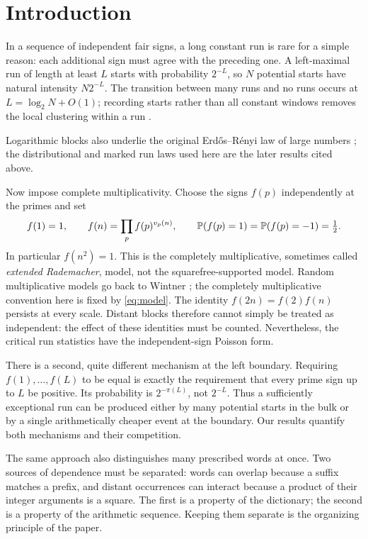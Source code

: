 \section{Introduction}\label{sec:introduction}
In a sequence of independent fair signs, a long constant run is rare for a
simple reason: each additional sign must agree with the preceding one.
A left-maximal run of length at least $L$ starts with probability $2^{-L}$,
so $N$ potential starts have natural intensity $N2^{-L}$. The transition
between many runs and no runs occurs at $L=\log_2N+O(1)$; recording starts
rather than all constant windows removes the local clustering within a run
\cite{ArratiaGoldsteinGordon1990,ArratiaGordonWaterman1990,Godbole1991}.

Logarithmic blocks also underlie the original Erd\H{o}s--R\'enyi law
of large numbers \cite{ErdosRenyi1970}; the distributional and marked
run laws used here are the later results cited above.

Now impose complete multiplicativity. Choose the signs $f(p)$ independently
at the primes and set
\begin{equation}\label{eq:model}
 f(1)=1,\qquad f(n)=\prod_p f(p)^{v_p(n)},\qquad
 \mathbb P(f(p)=1)=\mathbb P(f(p)=-1)=\tfrac12.
\end{equation}
In particular $f(n^2)=1$. This is the completely multiplicative, sometimes
called \emph{extended Rademacher}, model, not the squarefree-supported model. Random
multiplicative models go back to Wintner \cite{Wintner1944}; the
completely multiplicative convention here is fixed by \eqref{eq:model}.
The identity $f(2n)=f(2)f(n)$ persists at every scale. Distant blocks therefore cannot simply be treated as independent: the
effect of these identities must be counted. Nevertheless, the critical run
statistics have the independent-sign Poisson form.

There is a second, quite different mechanism at the left boundary. Requiring
$f(1),\ldots,f(L)$ to be equal is exactly the requirement that every prime
sign up to $L$ be positive. Its probability is $2^{-\pi(L)}$, not $2^{-L}$.
Thus a sufficiently exceptional run can be produced either by many potential
starts in the bulk or by a single arithmetically cheaper event at the boundary.
Our results quantify both mechanisms and their competition.

The same approach also distinguishes many prescribed words at once. Two
sources of dependence must be separated: words can overlap because a
suffix matches a prefix, and distant occurrences can interact because a
product of their integer arguments is a square. The first is a property
of the dictionary; the second is a property of the arithmetic sequence.
Keeping them separate is the organizing principle of the paper.

